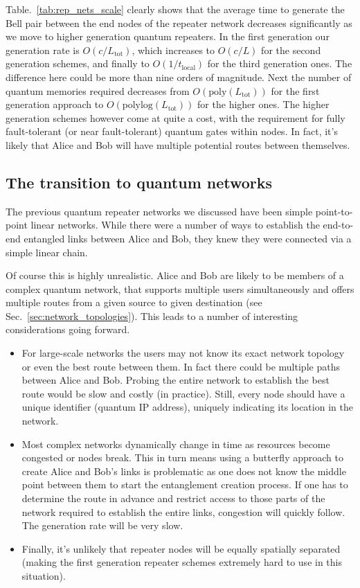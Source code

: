 Table.~\ref{tab:rep_nets_scale} clearly shows that the average time to generate the Bell pair between the end nodes of the repeater network decreases significantly as we move to higher generation quantum repeaters. In the first generation our generation rate is $O(c/L_\mathrm{tot})$, which increases to $O(c/L)$ for the second generation schemes, and finally to $O(1/t_\mathrm{local})$ for the third generation ones. The difference here could be more than nine orders of magnitude. Next the number of quantum memories required decreases from $O(\mathrm{poly}(L_\mathrm{tot}))$ for the first generation approach to $O(\mathrm{polylog}(L_\mathrm{tot}))$ for the higher ones. The higher generation schemes however come at quite a cost, with the requirement for fully fault-tolerant (or near fault-tolerant) quantum gates within nodes. In fact, it's likely that Alice and Bob will have multiple potential routes between themselves.

\subsection{The transition to quantum networks}

The previous quantum repeater networks we discussed have been simple point-to-point linear networks. While there were a number of ways to establish the end-to-end entangled links between Alice and Bob, they knew they were connected via a simple linear chain.

Of course this is highly unrealistic. Alice and Bob are likely to be members of a complex quantum network, that supports multiple users simultaneously and offers multiple routes from a given source to given destination (see Sec.~\ref{sec:network_topologies}). This leads to a number of interesting considerations going forward. 

\begin{itemize}
\item For large-scale networks the users may not know its exact network topology or even the best route between them. In fact there could be multiple paths between Alice and Bob. Probing the entire network to establish the best route would be slow and costly (in practice). Still, every node should have a unique identifier (quantum IP address), uniquely indicating its location in the network.
\item Most complex networks dynamically change in time as resources become congested or nodes break. This in turn means using a butterfly approach to create Alice and Bob's links is problematic as one does not know the middle point between them to start the entanglement creation process. If one has to determine the route in advance and restrict access to those parts of the network required to establish the entire links, congestion will quickly follow. The generation rate will be very slow. 
\item Finally, it's unlikely that repeater nodes will be equally spatially separated (making the first generation repeater schemes extremely hard to use in this situation). 
\end{itemize}

